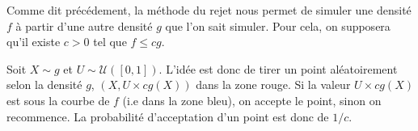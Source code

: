 \begin{proposition}
    Comme dit précédement, la méthode du rejet nous permet de simuler une densité $f$ à partir d'une autre densité $g$ que l'on
    sait simuler. Pour cela, on supposera qu'il existe $c > 0$ tel que $ f \leqslant cg$. 
        \begin{center}
        \end{center}

    Soit $X \sim g$ et $U \sim \mathcal{U}([0,1])$.  
    L'idée est donc de tirer un point aléatoirement selon la densité $g$, $(X, U \times cg(X))$ dans la zone rouge. 
    Si la valeur $ U \times cg(X)$ est sous la courbe de $f$ (i.e dans la zone bleu), on accepte le point, 
    sinon on recommence. La probabilité d'acceptation d'un point est donc de $ 1/c$.  
\end{proposition}

